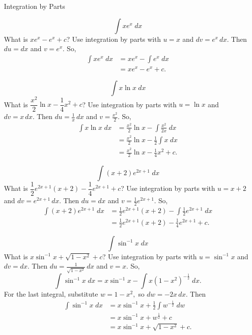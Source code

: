 \documentclass{article}
\begin{document}
\begin{category}{Integration by Parts}

  \begin{clue}
    \[ \int x e^{x} \; dx \]
  \response
    What is $x e^{x} - e^{x} + c$?
  \solution
    Use integration by parts with $u=x$ and $dv=e^{x}\,dx.$ Then $du=dx$ and $v=e^{x}.$ So,
    \begin{align*}
    \int x e^{x} \; dx
    &= x e^{x} - \int e^{x} \; dx \\
    &= x e^{x} - e^{x} + c.
    \end{align*}
  \end{clue}

  \begin{clue}
    \[ \int x \ln x \; dx \]
  \response
    What is $\dfrac{x^{2}}{2} \ln x - \dfrac{1}{4} x^{2} + c$?
  \solution
    Use integration by parts with $u=\ln x$ and $dv=x\,dx.$ Then $du=\frac{1}{x}\,dx$ and $v=\frac{x^{2}}{2}.$ So,
    \begin{align*}
    \int x \ln x \; dx
    &= \frac{x^{2}}{2} \ln x - \int \frac{x^{2}}{2x} \; dx \\
    &= \frac{x^{2}}{2} \ln x - \frac{1}{2} \int x \; dx \\
    &= \frac{x^{2}}{2} \ln x - \frac{1}{4} x^{2} + c.
    \end{align*}
  \end{clue}

  \begin{clue}
    \[ \int (x+2) e^{2x+1} \; dx \]
  \response
    What is $\dfrac{1}{2}e^{2x+1}(x+2) - \dfrac{1}{4}e^{2x+1} + c$?
  \solution
    Use integration by parts with $u=x+2$ and $dv=e^{2x+1}\,dx.$ Then $du=dx$ and $v=\frac{1}{2}e^{2x+1}.$ So,
    \begin{align*}
    \int (x+2) e^{2x+1} \; dx
    &= \frac{1}{2}e^{2x+1}(x+2) - \int \frac{1}{2}e^{2x+1} \; dx \\
    &= \frac{1}{2}e^{2x+1}(x+2) - \frac{1}{4}e^{2x+1} + c.
    \end{align*}
  \end{clue}

  \begin{clue}
    \[ \int \sin^{-1} x \; dx \]
  \response
    What is $x\sin^{-1} x + \sqrt{1-x^{2}} + c$?
  \solution
    Use integration by parts with $u=\sin^{-1} x$ and $dv=dx.$ Then $du=\frac{1}{\sqrt{1-x^{2}}}\,dx$ and $v=x.$ So,
    \[
    \int \sin^{-1} x \; dx = x\sin^{-1} x - \int x (1-x^{2})^{-\frac{1}{2}} \; dx.
    \]
    For the last integral, substitute $w=1-x^{2},$ so $dw=-2x\,dx.$ Then
    \begin{align*}
    \int \sin^{-1} x \; dx
    &= x\sin^{-1} x + \frac{1}{2} \int w^{-\frac{1}{2}} \; dw \\
    &= x\sin^{-1} x + w^{\frac{1}{2}} + c \\
    &= x\sin^{-1} x + \sqrt{1-x^{2}} + c.
    \end{align*}
  \end{clue}


\end{category}
\end{document}
